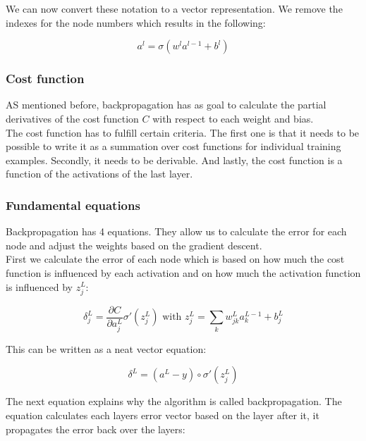 We can now convert these notation to a vector representation. We remove the indexes for the node numbers which results in the following:

\begin{equation} 
a^l = \sigma (w^la^{l-1}+b^l)
\end{equation}

		\subsubsection{Cost function}
		
AS mentioned before, backpropagation has as goal to calculate the partial derivatives of the cost function $C$ with respect to each weight and bias. \\
The cost function has to fulfill certain criteria. The first one is that it needs to be possible to write it as a summation over cost functions for individual training examples. Secondly, it needs to be derivable. And lastly, the cost function is a function of the activations of the last layer. 


		\subsubsection{Fundamental equations}

Backpropagation has 4 equations. They allow us to calculate the error for each node and adjust the weights based on the gradient descent. \\

First we calculate the error of each node which is based on how much the cost function is influenced by each activation and on how much the activation function is influenced by $z_j^L$:

\begin{equation} 
\delta^L_j = \frac{\partial C}{\partial a^L_j} \sigma'(z_j^L)
\text{ with }
z_j^L = \sum_k w^L_{jk}a^{L-1}_k+b^L_j
\end{equation}

This can be written as a neat vector equation:

\begin{equation} 
\delta^L = (a^L-y) \circ \sigma'(z_j^L)
\end{equation}

The next equation explains why the algorithm is called backpropagation. The equation calculates each layers error vector based on the layer after it, it propagates the error back over the layers:

